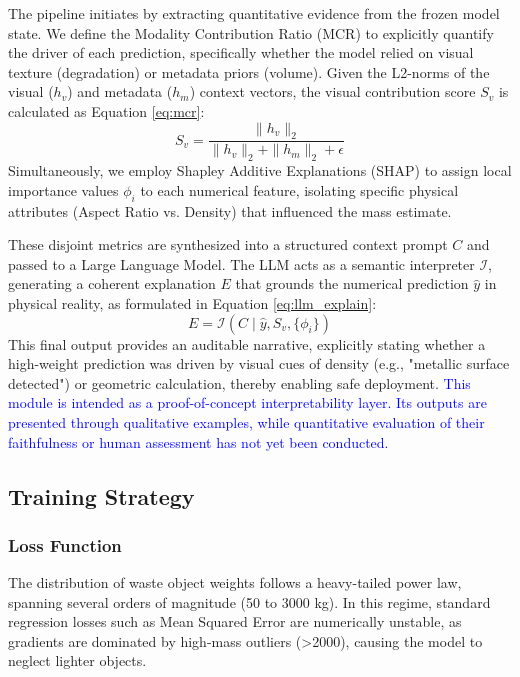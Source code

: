 \documentclass[journal,twoside,web]{ieeecolor}
\newcommand{\x}[1]{\textcolor{blue}{#1}}
\begin{document}
The pipeline initiates by extracting quantitative evidence from the frozen model state. We define the Modality Contribution Ratio (MCR) \cite{zhang2025modal} to explicitly quantify the driver of each prediction, specifically whether the model relied on visual texture (degradation) or metadata priors (volume). Given the L2-norms of the visual ($h_v$) and metadata ($h_m$) context vectors, the visual contribution score $S_v$ is calculated as Equation \eqref{eq:mcr}:
\begin{equation} \label{eq:mcr}
    S_v = \frac{\|h_v\|_2}{\|h_v\|_2 + \|h_m\|_2 + \epsilon}
\end{equation}
Simultaneously, we employ Shapley Additive Explanations (SHAP) to assign local importance values $\phi_i$ to each numerical feature, isolating specific physical attributes (Aspect Ratio vs. Density) that influenced the mass estimate.

These disjoint metrics are synthesized into a structured context prompt $C$ and passed to a Large Language Model. The LLM acts as a semantic interpreter $\mathcal{I}$, generating a coherent explanation $E$ that grounds the numerical prediction $\hat{y}$ in physical reality, as formulated in Equation \eqref{eq:llm_explain}:
\begin{equation} \label{eq:llm_explain}
    E = \mathcal{I}(C \mid \hat{y}, S_v, \{\phi_i\})
\end{equation}
This final output provides an auditable narrative, explicitly stating whether a high-weight prediction was driven by visual cues of density (e.g., "metallic surface detected") or geometric calculation, thereby enabling safe deployment. \x{This module is intended as a proof-of-concept interpretability layer. Its outputs are presented through qualitative examples, while quantitative evaluation of their faithfulness or human assessment has not yet been conducted.}

\subsection{Training Strategy}
\subsubsection{Loss Function}

The distribution of waste object weights follows a heavy-tailed power law, spanning several orders of magnitude (50 to 3000 kg). In this regime, standard regression losses such as Mean Squared Error are numerically unstable, as gradients are dominated by high-mass outliers (>2000), causing the model to neglect lighter objects.
\end{document}

